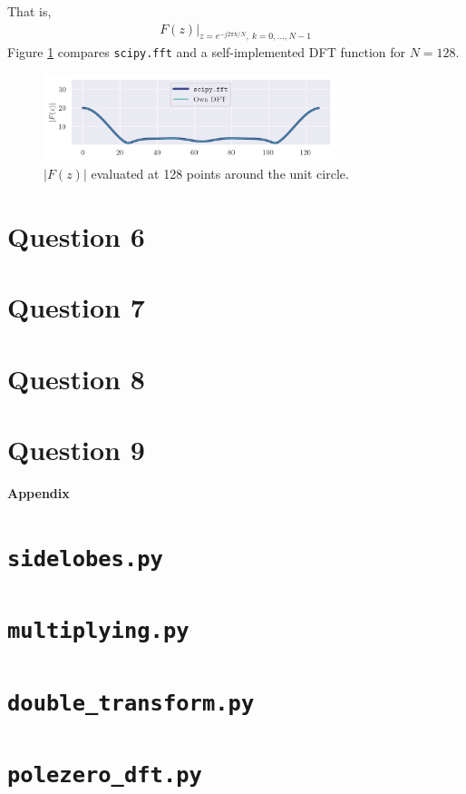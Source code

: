 \documentclass[a4paper, 11pt]{article}
\begin{document}
\begin{enumerate}[label=\alph*)]
    That is,
    \begin{align*}
        F(z) \big|_{z=e^{-j2\pi k/N},\ k=0,\ldots,N-1}
    \end{align*}
    Figure \ref{fig:q5b_dftsample} compares \texttt{scipy.fft} and a
    self-implemented DFT function for $N=128$.
    \begin{figure}[ht]
        \centering
        \includegraphics[width=0.76\textwidth]{images/q5b_dftsample.png}
        \caption{$|F(z)|$ evaluated at 128 points around the unit circle.}
        \label{fig:q5b_dftsample}
    \end{figure}

\end{enumerate}

\newpage
\section*{Question 6}
\section*{Question 7}
\section*{Question 8}
\section*{Question 9}

\newpage
\appendix
\begin{center}
    \LARGE{\textbf{Appendix}}
\end{center}

\section{\texttt{sidelobes.py}}


\newpage
\section{\texttt{multiplying.py}}


\newpage
\section{\texttt{double\_transform.py}}


\newpage
\section{\texttt{polezero\_dft.py}}

\end{document}

